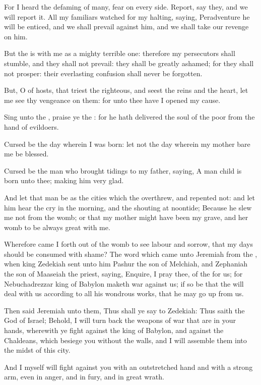 \Verse For I heard the defaming of many, fear on every side. Report, say they, and we will report it. All my familiars watched for my halting, saying, Peradventure he will be enticed, and we shall prevail against him, and we shall take our revenge on him.

\Verse But the \LORD is with me as a mighty terrible one: therefore my persecutors shall stumble, and they shall not prevail: they shall be greatly ashamed; for they shall not prosper: their everlasting confusion shall never be forgotten.

\Verse But, O \LORD of hosts, that triest the righteous, and seest the reins and the heart, let me see thy vengeance on them: for unto thee have I opened my cause.

\Verse Sing unto the \LORD, praise ye the \LORD: for he hath delivered the soul of the poor from the hand of evildoers.

\Verse Cursed be the day wherein I was born: let not the day wherein my mother bare me be blessed.

\Verse Cursed be the man who brought tidings to my father, saying, A man child is born unto thee; making him very glad.

\Verse And let that man be as the cities which the \LORD overthrew, and repented not: and let him hear the cry in the morning, and the shouting at noontide; \Verse Because he slew me not from the womb; or that my mother might have been my grave, and her womb to be always great with me.

\Verse Wherefore came I forth out of the womb to see labour and sorrow, that my days should be consumed with shame?  
\Chapter
\Verse The word which came unto Jeremiah from the \LORD, when king Zedekiah sent unto him Pashur the son of Melchiah, and Zephaniah the son of Maaseiah the priest, saying, \Verse Enquire, I pray thee, of the \LORD for us; for Nebuchadrezzar king of Babylon maketh war against us; if so be that the \LORD will deal with us according to all his wondrous works, that he may go up from us.

\Verse Then said Jeremiah unto them, Thus shall ye say to Zedekiah: \Verse Thus saith the \LORD God of Israel; Behold, I will turn back the weapons of war that are in your hands, wherewith ye fight against the king of Babylon, and against the Chaldeans, which besiege you without the walls, and I will assemble them into the midst of this city.

\Verse And I myself will fight against you with an outstretched hand and with a strong arm, even in anger, and in fury, and in great wrath.

